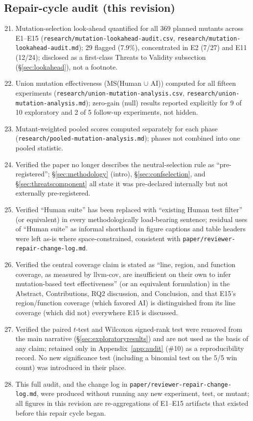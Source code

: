 \documentclass[10pt,conference]{IEEEtran}
\begin{document}
\subsection{Repair-cycle audit (this revision)}
\begin{enumerate}
\setcounter{enumi}{20}
\item Mutation-selection look-ahead quantified for all 369 planned mutants across E1--E15 (\texttt{research/mutation-lookahead-audit.csv}, \texttt{research/mutation-lookahead-audit.md}); 29 flagged (7.9\%), concentrated in E2 (7/27) and E11 (12/24); disclosed as a first-class Threats to Validity subsection (\S\ref{sec:lookahead}), not a footnote.
\item Union mutation effectiveness (MS(Human $\cup$ AI)) computed for all fifteen experiments (\texttt{research/union-mutation-analysis.csv}, \texttt{research/union-mutation-analysis.md}); zero-gain (null) results reported explicitly for 9 of 10 exploratory and 2 of 5 follow-up experiments, not hidden.
\item Mutant-weighted pooled scores computed separately for each phase (\texttt{research/pooled-mutation-analysis.md}); phases not combined into one pooled statistic.
\item Verified the paper no longer describes the neutral-selection rule as ``pre-registered''; \S\ref{sec:methodology} (intro), \S\ref{sec:confselection}, and \S\ref{sec:threatscomponent} all state it was pre-declared internally but not externally pre-registered.
\item Verified ``Human suite'' has been replaced with ``existing Human test filter'' (or equivalent) in every methodologically load-bearing sentence; residual uses of ``Human suite'' as informal shorthand in figure captions and table headers were left as-is where space-constrained, consistent with \texttt{paper/reviewer-repair-change-log.md}.
\item Verified the central coverage claim is stated as ``line, region, and function coverage, as measured by llvm-cov, are insufficient on their own to infer mutation-based test effectiveness'' (or an equivalent formulation) in the Abstract, Contributions, RQ2 discussion, and Conclusion, and that E15's region/function coverage (which favored AI) is distinguished from its line coverage (which did not) everywhere E15 is discussed.
\item Verified the paired $t$-test and Wilcoxon signed-rank test were removed from the main narrative (\S\ref{sec:exploratoryresults}) and are not used as the basis of any claim; retained only in Appendix~\ref{app:audit} (\#10) as a reproducibility record. No new significance test (including a binomial test on the 5/5 win count) was introduced in their place.
\item This full audit, and the change log in \texttt{paper/reviewer-repair-change-log.md}, were produced without running any new experiment, test, or mutant; all figures in this revision are re-aggregations of E1--E15 artifacts that existed before this repair cycle began.
\end{enumerate}
\end{document}
